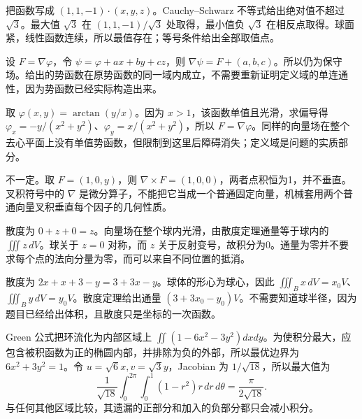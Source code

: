 \documentclass[UTF8,12pt,a4paper,fontset=fandol]{ctexart}
\begin{document}
\begin{solve}\label{ans:c45q19}
把函数写成 $(1,1,-1)\cdot(x,y,z)$。Cauchy--Schwarz 不等式给出绝对值不超过 $\sqrt3$。最大值 $\sqrt3$ 在 $(1,1,-1)/\sqrt3$ 处取得，最小值负 $\sqrt3$ 在相反点取得。球面紧，线性函数连续，所以最值存在；等号条件给出全部取值点。
\end{solve}

\begin{solve}\label{ans:c45q20}
设 $F=\nabla\varphi$，令 $\psi=\varphi+ax+by+cz$，则 $\nabla\psi=F+(a,b,c)$。所以仍为保守场。给出的势函数在原势函数的同一域内成立，不需要重新证明定义域的单连通性，因为势函数已经实际构造出来。
\end{solve}

\begin{solve}\label{ans:c45q21}
取 $\varphi(x,y)=\arctan(y/x)$。因为 $x>1$，该函数单值且光滑，求偏导得 $\varphi_x=-y/(x^2+y^2)$、$\varphi_y=x/(x^2+y^2)$，所以 $F=\nabla\varphi$。同样的向量场在整个去心平面上没有单值势函数，但限制到这里后障碍消失；定义域是问题的实质部分。
\end{solve}

\begin{solve}\label{ans:c45q22}
不一定。取 $F=(1,0,y)$，则 $\nabla\times F=(1,0,0)$，两者点积恒为1，并不垂直。叉积符号中的 $\nabla$ 是微分算子，不能把它当成一个普通固定向量，机械套用两个普通向量叉积垂直每个因子的几何性质。
\end{solve}

\begin{solve}\label{ans:c45q23}
散度为 $0+z+0=z$。向量场在整个球内光滑，由散度定理通量等于球内的 $\iiint z\,dV$。球关于 $z=0$ 对称，而 $z$ 关于反射变号，故积分为0。通量为零并不要求每个点的法向分量为零，而可以来自不同位置的抵消。
\end{solve}

\begin{solve}\label{ans:c45q24}
散度为 $2x+x+3-y=3+3x-y$。球体的形心为球心，因此 $\iiint_Bx\,dV=x_0V$、$\iiint_By\,dV=y_0V$。散度定理给出通量 $(3+3x_0-y_0)V$。不需要知道球半径，因为题目已经给出体积，且散度只是坐标的一次函数。
\end{solve}

\begin{solve}\label{ans:c45q25}
Green 公式把环流化为内部区域上 $\iint(1-6x^2-3y^2)dxdy$。为使积分最大，应包含被积函数为正的椭圆内部，并排除为负的外部，所以最优边界为 $6x^2+3y^2=1$。令 $u=\sqrt6x,v=\sqrt3y$，Jacobian 为 $1/\sqrt{18}$，所以最大值为\[\frac1{\sqrt{18}}\int_0^{2\pi}\int_0^1(1-r^2)r\,dr\,d\theta=\frac{\pi}{2\sqrt{18}}.\]与任何其他区域比较，其遗漏的正部分和加入的负部分都只会减小积分。
\end{solve}
\end{document}
